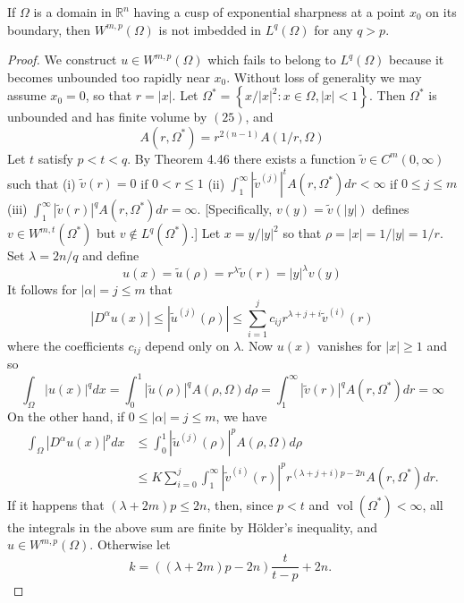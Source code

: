 \begin{theorem}
  If $\Omega$ is a domain in $\mathbb{R}^n$ having a cusp of exponential sharpness at a point $x_0$ on its boundary, then $W^{m, p}(\Omega)$ is not imbedded in $L^q(\Omega)$ for any $q>p$.
\end{theorem}

\begin{proof}
  We construct $u \in W^{m, p}(\Omega)$ which fails to belong to $L^q(\Omega)$ because
  it becomes unbounded too rapidly near $x_0$. Without loss of generality we may assume $x_0=0$, 
  so that $r=|x|$. Let $\Omega^*=\left\{x /|x|^2: x \in \Omega,|x|<1\right\}$.
  Then $\Omega^*$ is unbounded and has finite volume by $(25)$, and
  \[
  A\left(r, \Omega^*\right)=r^{2(n-1)} A(1 / r, \Omega)
  \]
  Let $t$ satisfy $p<t<q$. By Theorem 4.46 there exists a
  function $\tilde{v} \in C^m(0, \infty)$ such that
  (i) $\tilde{v}(r)=0$ if $0<r \leq 1$
  (ii) $\int_1^{\infty}\left|\tilde{v}^{(j)}\right|^t A\left(r, \Omega^*\right) d r<\infty$ if $0 \leq j \leq m$
  (iii) $\int_1^{\infty}|\tilde{v}(r)|^q A\left(r, \Omega^*\right) d r=\infty$.
  [Specifically, $v(y)=\tilde{v}(|y|)$ defines $v \in W^{m, t}\left(\Omega^*\right)$ but $v \notin L^q\left(\Omega^*\right)$.] Let $x=y /|y|^2$ so that $\rho=|x|=1 /|y|=1 / r$. Set $\lambda=2 n / q$ and define
  \[
  u(x)=\tilde{u}(\rho)=r^\lambda \tilde{v}(r)=|y|^\lambda v(y)
  \]
  It follows for $|\alpha|=j \leq m$ that
  \[
  \left|D^\alpha u(x)\right| \leq\left|\tilde{u}^{(j)}(\rho)\right| \leq \sum_{i=1}^j c_{i j} r^{\lambda+j+i} \tilde{v}^{(i)}(r)
  \]
  where the coefficients $c_{i j}$ depend only on $\lambda$. Now $u(x)$ vanishes for $|x| \geq 1$ and so
  \[
  \int_{\Omega}|u(x)|^q d x=\int_0^1|\tilde{u}(\rho)|^q A(\rho, \Omega) d \rho=\int_1^{\infty}|\tilde{v}(r)|^q A\left(r, \Omega^*\right) d r=\infty
  \]
  On the other hand, if $0 \leq|\alpha|=j \leq m$, we have
  \[
  \begin{aligned}
  \int_{\Omega}\left|D^\alpha u(x)\right|^p d x & \leq \int_0^1\left|\tilde{u}^{(j)}(\rho)\right|^p A(\rho, \Omega) d \rho \\
  & \leq K \sum_{i=0}^j \int_1^{\infty}\left|\tilde{v}^{(i)}(r)\right|^p r^{(\lambda+j+i) p-2 n} A\left(r, \Omega^*\right) d r .
  \end{aligned}
  \]
  If it happens that $(\lambda+2 m) p \leq 2 n$, then, since $p<t$ and $\operatorname{vol}\left(\Omega^*\right)<\infty$, all the integrals in the above sum are finite by Hölder's inequality, and $u \in W^{m, p}(\Omega)$. Otherwise let
  \[
  k=((\lambda+2 m) p-2 n) \frac{t}{t-p}+2 n \text {. }
\]
\end{proof}
